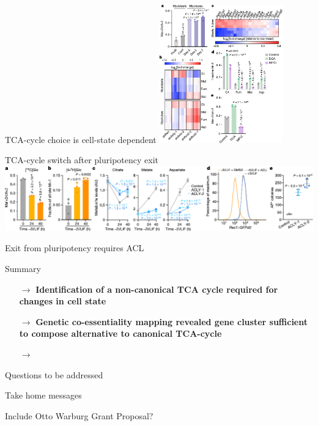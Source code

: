 \documentclass[10pt, aspectratio=169]{beamer}
\begin{document}
\begin{frame}{TCA-cycle choice is cell-state dependent}
\includegraphics[width=0.4\textwidth]{figures/Arnold_2022_fig3.pdf}
\end{frame}

\begin{frame}{TCA-cycle switch after pluripotency exit}
\includegraphics[width=\textwidth]{figures/Arnold_2022_fig4.pdf}
\end{frame}

\begin{frame}{Exit from pluripotency requires ACL}

\end{frame}

\begin{frame}{Summary}
\begin{itemize}
    \item[$\rightarrow$] \textbf{Identification of a non-canonical TCA cycle required for changes in cell state} \\[0.3cm]
    \item[$\rightarrow$] \textbf{Genetic co-essentiality mapping revealed gene cluster sufficient to compose alternative to canonical TCA-cycle}
    \item[$\rightarrow$] \textbf{}
\end{itemize}
\end{frame}

\begin{frame}{Questions to be addressed}

\end{frame}

\begin{frame}{Take home messages}

Include Otto Warburg Grant Proposal?
\end{frame}
\end{document}
